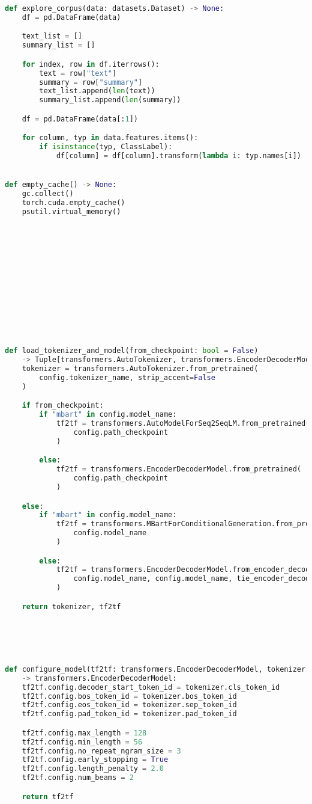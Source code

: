 \begin{lstlisting}[language=Python, caption=Hilfsmethoden]
def explore_corpus(data: datasets.Dataset) -> None:
    df = pd.DataFrame(data)

    text_list = []
    summary_list = []

    for index, row in df.iterrows():
        text = row["text"]
        summary = row["summary"]
        text_list.append(len(text))
        summary_list.append(len(summary))

    df = pd.DataFrame(data[:1])

    for column, typ in data.features.items():
        if isinstance(typ, ClassLabel):
            df[column] = df[column].transform(lambda i: typ.names[i])


def empty_cache() -> None:
    gc.collect()
    torch.cuda.empty_cache()
    psutil.virtual_memory()













def load_tokenizer_and_model(from_checkpoint: bool = False)
	-> Tuple[transformers.AutoTokenizer, transformers.EncoderDecoderModel]:
    tokenizer = transformers.AutoTokenizer.from_pretrained(
        config.tokenizer_name, strip_accent=False
    )

    if from_checkpoint:
        if "mbart" in config.model_name:
            tf2tf = transformers.AutoModelForSeq2SeqLM.from_pretrained(
                config.path_checkpoint
            )

        else:
            tf2tf = transformers.EncoderDecoderModel.from_pretrained(
                config.path_checkpoint
            )

    else:
        if "mbart" in config.model_name:
            tf2tf = transformers.MBartForConditionalGeneration.from_pretrained(
                config.model_name
            )

        else:
            tf2tf = transformers.EncoderDecoderModel.from_encoder_decoder_pretrained(
                config.model_name, config.model_name, tie_encoder_decoder=True
            )

    return tokenizer, tf2tf
    
    
    
    
    
    
def configure_model(tf2tf: transformers.EncoderDecoderModel, tokenizer: transformers.AutoTokenizer)
	-> transformers.EncoderDecoderModel:
    tf2tf.config.decoder_start_token_id = tokenizer.cls_token_id
    tf2tf.config.bos_token_id = tokenizer.bos_token_id
    tf2tf.config.eos_token_id = tokenizer.sep_token_id
    tf2tf.config.pad_token_id = tokenizer.pad_token_id

    tf2tf.config.max_length = 128
    tf2tf.config.min_length = 56
    tf2tf.config.no_repeat_ngram_size = 3
    tf2tf.config.early_stopping = True
    tf2tf.config.length_penalty = 2.0
    tf2tf.config.num_beams = 2

    return tf2tf
\end{lstlisting}
\newpage


